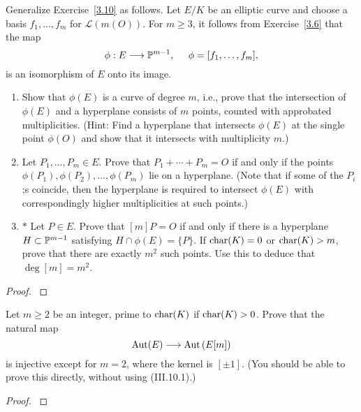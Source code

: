 \documentclass[12pt,reqno]{amsart}
\begin{document}
\begin{exe}\label{3.11}
Generalize Exercise~\ref{3.10} as follows.  Let $E/K$ be an elliptic curve and choose a basis $f_1, \hdots, f_m$ for $\mathcal{L}\left(m(O)\right)$.  For $m\geq 3$, it follows from Exercise~\ref{3.6} that the map
\[
\phi: E \longrightarrow {\mathbb P}^{m-1}, \;\;\;\;\;\phi=[f_1, \hdots, f_m],
\] 
is an isomorphism of $E$ onto its image.
\begin{enumerate}
\item
Show that $\phi(E)$ is a curve of degree $m$, i.e., prove that the intersection of $\phi(E)$ and a hyperplane consists of $m$ points, counted with approbated multiplicities.  (Hint: Find a hyperplane that intersects $\phi(E)$ at the single point $\phi(O)$ and show that it intersects with multiplicity $m$.)

\item
Let $P_1, \hdots, P_m\in E$.  Prove that $P_1+\cdots +P_m=O$ if and only if the points $\phi(P_1), \phi(P_2), \hdots, \phi(P_m)$ lie on a hyperplane.  (Note that if some of the $P_i$;s coincide, then the hyperplane is required to intersect $\phi(E)$ with correspondingly higher multiplicities at such points.)
\item
$\ast$ Let $P\in E$.  Prove that $[m]P=O$ if and only if there is a hyperplane $H \subset {\mathbb P}^{m-1}$ satisfying $H \cap \phi(E)=\{P\}$.  If ${\operatorname{char}}(K)=0$ or ${\operatorname{char}}(K)>m$, prove that there are exactly $m^2$ such points.  Use this to deduce that $\deg[m]=m^2$.
\end{enumerate}
\begin{proof}\label{s3.11}

\end{proof} 
\end{exe} 

\begin{exe}\label{3.12}
Let $m \geq 2$ be an integer, prime to ${\operatorname{char}}(K)$ if ${\operatorname{char}}(K)>0$.  Prove that the natural map
\[
{\operatorname{Aut}}(E)\longrightarrow {\operatorname{Aut}}\left(E[m]\right)
\]
is injective except for $m=2$, where the kernel is $[\pm 1]$.  (You should be able to prove this directly, without using (III.10.1).)
\begin{proof}\label{s3.12}

\end{proof} 
\end{exe} 
\end{document}
